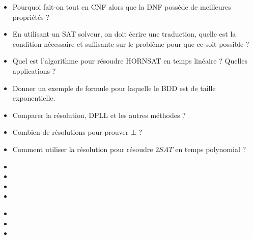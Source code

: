\documentclass{agregfiche}
\begin{document}
\begin{itemize}
    \item Pourquoi fait-on tout en CNF alors que la DNF possède de meilleures
      propriétés ?
    \item En utilisant un SAT solveur, on doit écrire une traduction, quelle
        est la condition nécessaire et suffisante sur le problème pour que ce soit
        possible ?
    \item Quel est l'algorithme pour résoudre HORNSAT en temps linéaire ?
        Quelles applications ?
    \item Donner un exemple de formule pour laquelle le BDD est de
    taille
        exponentielle.
      \item Comparer la résolution, DPLL et les autres méthodes ?
      \item Combien de résolutions pour prouver $\bot$ ?
      \item Comment utiliser la résolution pour résoudre $2SAT$ en temps polynomial ?
\end{itemize}

\secreferences

\begin{itemize}
    \item 
    \item 
    \item 
    \item 

\end{itemize}

\secdev

\begin{itemize}

\item 
\item 
\item 
\end{itemize}
\end{document}
